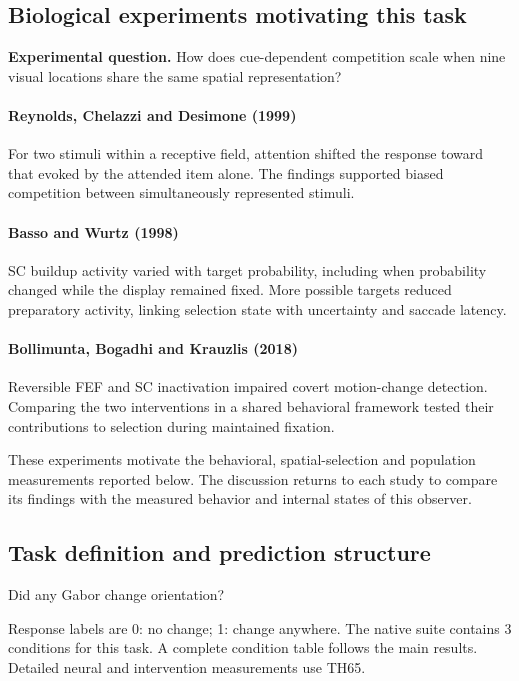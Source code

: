\documentclass[11pt]{article}
\begin{document}
\subsection{Biological experiments motivating this task}
\textbf{Experimental question.} How does cue-dependent competition scale when nine visual locations share the same spatial representation?

\paragraph{Reynolds, Chelazzi and Desimone (1999)} For two stimuli within a receptive field, attention shifted the response toward that evoked by the attended item alone. The findings supported biased competition between simultaneously represented stimuli. \cite{bio_competition}

\paragraph{Basso and Wurtz (1998)} SC buildup activity varied with target probability, including when probability changed while the display remained fixed. More possible targets reduced preparatory activity, linking selection state with uncertainty and saccade latency. \cite{bio_basso}

\paragraph{Bollimunta, Bogadhi and Krauzlis (2018)} Reversible FEF and SC inactivation impaired covert motion-change detection. Comparing the two interventions in a shared behavioral framework tested their contributions to selection during maintained fixation. \cite{bio_bollimunta}

These experiments motivate the behavioral, spatial-selection and population measurements reported below. The discussion returns to each study to compare its findings with the measured behavior and internal states of this observer.
\subsection{Task definition and prediction structure}
Did any Gabor change orientation?

Response labels are 0: no change; 1: change anywhere. The native suite contains 3 conditions for this task. A complete condition table follows the main results. Detailed neural and intervention measurements use TH65.
\end{document}
